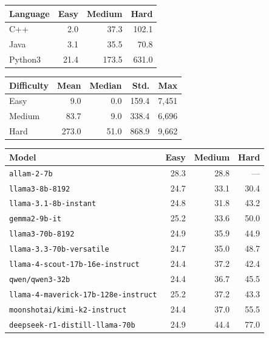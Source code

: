 \begin{tabular}{lrrr}
\hline\hline
\textbf{Language} & \textbf{Easy} & \textbf{Medium} & \textbf{Hard} \\
\hline
C++ & 2.0 & 37.3 & 102.1 \\
Java & 3.1 & 35.5 & 70.8 \\
Python3 & 21.4 & 173.5 & 631.0 \\
\hline\hline
\end{tabular}

\begin{tabular}{lrrrr}
\hline\hline
\textbf{Difficulty} & \textbf{Mean} & \textbf{Median} & \textbf{Std.} & \textbf{Max} \\
\hline
Easy & 9.0 & 0.0 & 159.4 & 7{,}451 \\
Medium & 83.7 & 9.0 & 338.4 & 6{,}696 \\
Hard & 273.0 & 51.0 & 868.9 & 9{,}662 \\
\hline\hline
\end{tabular}

\begin{tabular}{lrrr}
\hline\hline
\textbf{Model} & \textbf{Easy} & \textbf{Medium} & \textbf{Hard} \\
\hline
\texttt{allam-2-7b} & 28.3 & 28.8 & --- \\
\texttt{llama3-8b-8192} & 24.7 & 33.1 & 30.4 \\
\texttt{llama-3.1-8b-instant} & 24.8 & 31.8 & 43.2 \\
\texttt{gemma2-9b-it} & 25.2 & 33.6 & 50.0 \\
\texttt{llama3-70b-8192} & 24.9 & 35.9 & 44.9 \\
\texttt{llama-3.3-70b-versatile} & 24.7 & 35.0 & 48.7 \\
\texttt{llama-4-scout-17b-16e-instruct} & 24.4 & 37.2 & 42.4 \\
\texttt{qwen/qwen3-32b} & 24.4 & 36.7 & 45.5 \\
\texttt{llama-4-maverick-17b-128e-instruct} & 25.2 & 37.2 & 43.3 \\
\texttt{moonshotai/kimi-k2-instruct} & 24.4 & 37.0 & 55.5 \\
\texttt{deepseek-r1-distill-llama-70b} & 24.9 & 44.4 & 77.0 \\
\hline\hline
\end{tabular}


